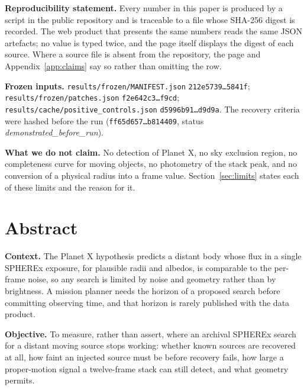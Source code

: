 \documentclass[11pt,a4paper]{article}
\newcommand{\code}[1]{\texttt{#1}}
\begin{document}
\begin{minipage}{0.94\textwidth}
\small\raggedright
\noindent\textbf{Reproducibility statement.} Every number in this paper is produced
by a script in the public repository and is traceable to a file whose SHA-256
digest is recorded. The web product that presents the same numbers reads the same
JSON artefacts; no value is typed twice, and the page itself displays the digest
of each source. Where a source file is absent from the repository, the page and
Appendix~\ref{app:claims} say so rather than omitting the row.

\medskip
\noindent\textbf{Frozen inputs.} \code{results/frozen/MANIFEST.json}
\code{212e5739\ldots{}5841f}; \code{results/frozen/patches.json}
\code{f2e642c3\ldots{}f9cd}; \code{results/cache/positive\_controls.json}
\code{d5996b91\ldots{}d9d9a}. The recovery criteria were hashed before the run
(\code{ff65d657\ldots{}b814409}, status \emph{demonstrated\_before\_run}).

\medskip
\noindent\textbf{What we do not claim.} No detection of Planet X, no sky exclusion
region, no completeness curve for moving objects, no photometry of the stack peak,
and no conversion of a physical radius into a frame value. Section~\ref{sec:limits}
states each of these limits and the reason for it.
\end{minipage}

\newpage

\section*{Abstract}
\noindent
\textbf{Context.} The Planet X hypothesis predicts a distant body whose flux in a
single SPHEREx exposure, for plausible radii and albedos, is comparable to the
per-frame noise, so any search is
limited by noise and geometry rather than by brightness. A mission planner needs
the horizon of a proposed search before committing observing time, and that
horizon is rarely published with the data product.

\medskip
\noindent\textbf{Objective.} To measure, rather than assert, where an archival
SPHEREx search for a distant moving source stops working: whether known sources
are recovered at all, how faint an injected source must be before recovery fails,
how large a proper-motion signal a twelve-frame stack can still detect, and what
geometry permits.
\end{document}
